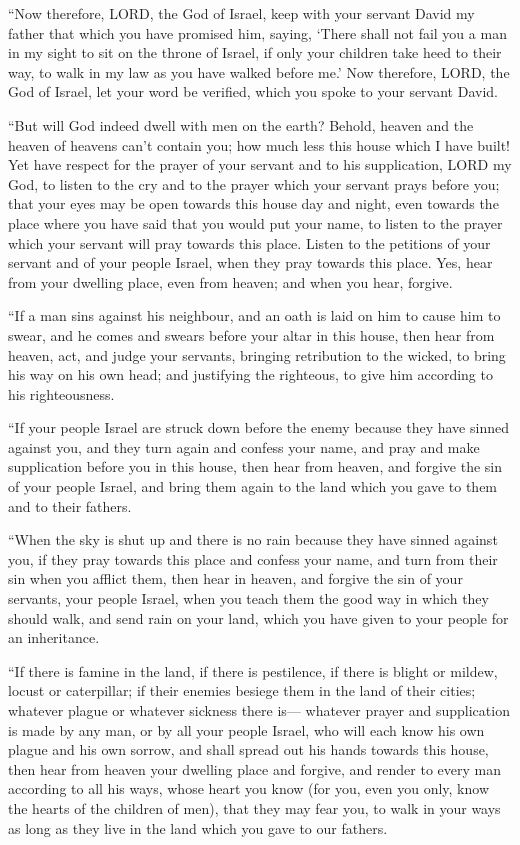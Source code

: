  ``Now therefore, LORD, the God of Israel, keep with your
servant David my father that which you have promised him, saying, `There
shall not fail you a man in my sight to sit on the throne of Israel, if
only your children take heed to their way, to walk in my law as you have
walked before me.'  Now therefore, LORD, the God of Israel,
let your word be verified, which you spoke to your servant David.

 ``But will God indeed dwell with men on the earth? Behold,
heaven and the heaven of heavens can't contain you; how much less this
house which I have built!  Yet have respect for the prayer
of your servant and to his supplication, LORD my God, to listen to the
cry and to the prayer which your servant prays before you; 
that your eyes may be open towards this house day and night, even
towards the place where you have said that you would put your name, to
listen to the prayer which your servant will pray towards this place.
 Listen to the petitions of your servant and of your people
Israel, when they pray towards this place. Yes, hear from your dwelling
place, even from heaven; and when you hear, forgive.

 ``If a man sins against his neighbour, and an oath is laid
on him to cause him to swear, and he comes and swears before your altar
in this house,  then hear from heaven, act, and judge your
servants, bringing retribution to the wicked, to bring his way on his
own head; and justifying the righteous, to give him according to his
righteousness.

 ``If your people Israel are struck down before the enemy
because they have sinned against you, and they turn again and confess
your name, and pray and make supplication before you in this house,
 then hear from heaven, and forgive the sin of your people
Israel, and bring them again to the land which you gave to them and to
their fathers.

 ``When the sky is shut up and there is no rain because
they have sinned against you, if they pray towards this place and
confess your name, and turn from their sin when you afflict them,
 then hear in heaven, and forgive the sin of your servants,
your people Israel, when you teach them the good way in which they
should walk, and send rain on your land, which you have given to your
people for an inheritance.

 ``If there is famine in the land, if there is pestilence,
if there is blight or mildew, locust or caterpillar; if their enemies
besiege them in the land of their cities; whatever plague or whatever
sickness there is---  whatever prayer and supplication is
made by any man, or by all your people Israel, who will each know his
own plague and his own sorrow, and shall spread out his hands towards
this house,  then hear from heaven your dwelling place and
forgive, and render to every man according to all his ways, whose heart
you know (for you, even you only, know the hearts of the children of
men),  that they may fear you, to walk in your ways as long
as they live in the land which you gave to our fathers.

